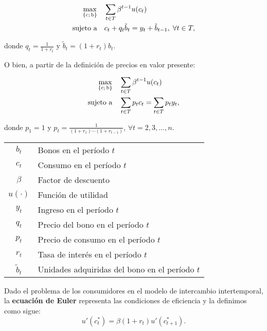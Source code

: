 \documentclass[8pt,a4paper]{extarticle}
\begin{document}
\begin{multicols}{3}
	\begin{align*}
		\max_{\left\{ \mathrm{c};\, \mathrm{b} \right\}} \quad & \sum_{t \in T} \beta^{t-1} u(c_t)                                 \\
		\textnormal{sujeto a} \quad                            & c_t + q_t \tilde{b}_t = y_t + \tilde{b}_{t-1},\; \forall t \in T,
	\end{align*}

	donde $\displaystyle q_t = \frac{1}{1 + r_t}$ y $\tilde{b}_t = (1 + r_t) b_t$.

	O bien, a partir de la definición de precios en valor presente:

	\begin{align*}
		\max_{\left\{ \mathrm{c};\, \mathrm{b} \right\}} \quad & \sum_{t \in T} \beta^{t-1} u(c_t)                \\
		\textnormal{sujeto a} \quad                            & \sum_{t \in T} p_t c_t = \sum_{t \in T} p_t y_t,
	\end{align*}

	donde $p_1 = 1$ y $\displaystyle p_t = \frac{1}{(1 + r_1) \cdots (1 + r_{t - 1})}$, $\forall t = 2, 3, \dots, n$.

	\begin{center}
		\begin{tabular}{ c l }
			\hline
			$b_t$         & Bonos en el período $t$                        \\
			$c_t$         & Consumo en el período $t$                      \\
			$\beta$       & Factor de descuento                            \\
			$u(\cdot)$    & Función de utilidad                            \\
			$y_t$         & Ingreso en el período $t$                      \\
			$q_t$         & Precio del bono en el período $t$              \\
			$p_t$         & Precio de consumo en el período $t$            \\
			$r_t$         & Tasa de interés en el período $t$              \\
			$\tilde{b}_t$ & Unidades adquiridas del bono en el período $t$ \\
			\hline
		\end{tabular}
	\end{center}

	\begin{boxdef}
		Dado el problema de los consumidores en el modelo de intercambio intertemporal, la \textbf{ecuación de Euler} representa las condiciones de eficiencia y la definimos como sigue:
		\[u'(c^*_t) = \beta (1 + r_t) u'(c^*_{t + 1}).\]
	\end{boxdef}


\end{multicols}
\end{document}
